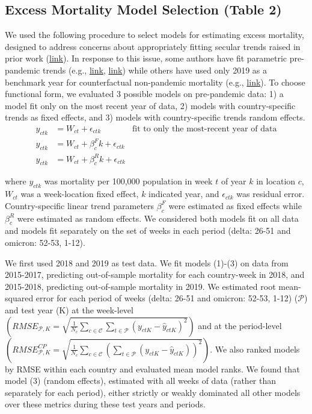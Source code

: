 \documentclass[
]{article}
\begin{document}
\hypertarget{excess-mortality-model-selection-table-2}{%
\subsection{Excess Mortality Model Selection (Table
2)}\label{excess-mortality-model-selection-table-2}}

We used the following procedure to select models for estimating excess
mortality, designed to address concerns about appropriately fitting
secular trends raised in prior work
(\href{https://www.nber.org/papers/w29503}{link}). In response to this
issue, some authors have fit parametric pre-pandemic trends (e.g.,
\href{https://www.nber.org/papers/w29503}{link},
\href{https://www.nber.org/papers/w30104}{link}) while others have used
only 2019 as a benchmark year for counterfactual non-pandemic mortality
(e.g., \href{https://www.nber.org/papers/w30512}{link}). To choose
functional form, we evaluated 3 possible models on pre-pandemic data: 1)
a model fit only on the most recent year of data, 2) models with
country-specific trends as fixed effects, and 3) models with
country-specific trends random effects. \begin{align}
y_{ctk} &= {W}_{ct} + \epsilon_{ctk} &\text{fit to only the most-recent year of data}\\
y_{ctk} &= {W}_{ct} + \beta_c^F k + \epsilon_{ctk} \\
y_{ctk} &= {W}_{ct} + \beta_c^R k + \epsilon_{ctk} 
\end{align}

where \(y_{ctk}\) was mortality per 100,000 population in week \(t\) of
year \(k\) in location \(c\), \({W}_{ct}\) was a week-location fixed
effect, \(k\) indicated year, and \(\epsilon_{ctk}\) was residual error.
Country-specific linear trend parameters \(\beta_c^F\) were estimated as
fixed effects while \(\beta_c^R\) were estimated as random effects. We
considered both models fit on all data and models fit separately on the
set of weeks in each period (delta: 26-51 and omicron: 52-53, 1-12).

We first used 2018 and 2019 as test data. We fit models (1)-(3) on data
from 2015-2017, predicting out-of-sample mortality for each country-week
in 2018, and 2015-2018, predicting out-of-sample mortality in 2019. We
estimated root mean-squared error for each period of weeks (delta: 26-51
and omicron: 52-53, 1-12) (\(\mathcal{P}\)) and test year (K) at the
week-level
\(\left(RMSE_{\mathcal{P}, K} = \sqrt{\frac{1}{N_c} \sum_{c \in \mathcal{C}} \sum_{t \in \mathcal{P}} \left(y_{ctK}-\hat{y}_{ctK}\right)^2}\right)\)
and at the period-level
\(\left(RMSE_{\mathcal{P}, K}^{CP} = \sqrt{\frac{1}{N_c} \sum_{c \in \mathcal{C}} \left(\sum_{t \in \mathcal{P}} \left(y_{ctK}-\hat{y}_{ctK}\right)\right)^2}\right)\).
We also ranked models by RMSE within each country and evaluated mean
model ranks. We found that model (3) (random effects), estimated with
all weeks of data (rather than separately for each period), either
strictly or weakly dominated all other models over these metrics during
these test years and periods.
\end{document}
